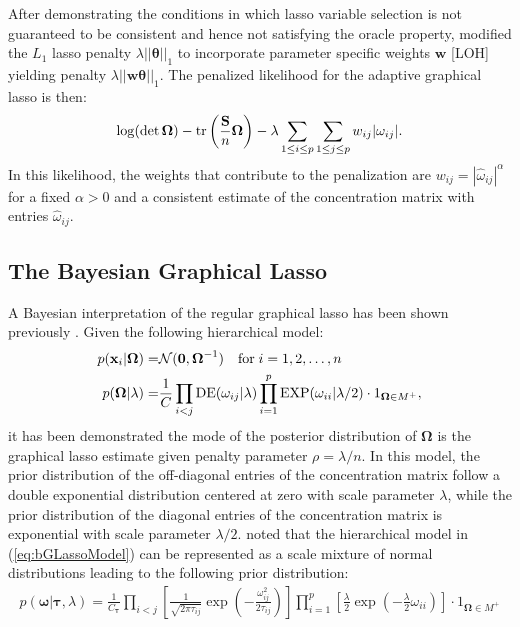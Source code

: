 After demonstrating the conditions in which lasso variable selection is not guaranteed to be consistent and hence not satisfying the oracle property, \cite{zou2006} modified the $L_1$ lasso penalty $\lambda ||\boldsymbol{\theta}||_1$ to incorporate parameter specific weights $\textbf{w}$ [LOH] yielding penalty $\lambda ||\textbf{w} \boldsymbol{\theta}||_1$. The penalized likelihood for the adaptive graphical lasso is then:
\begin{align}
\log(\det \boldsymbol{\Omega})-\operatorname{tr} \left(\frac{\mathbf{S}}{n} \boldsymbol{\Omega}\right) - \lambda \sum_{1\leq i \leq p} \sum_{1 \leq j \leq p} w_{ij} |\omega_{ij}|.
\end{align}
In this likelihood, the weights that contribute to the penalization are $w_{ij}=|\hat{\omega}_{ij}|^\alpha$ for a fixed $\alpha >0$ and a consistent estimate of the concentration matrix with entries $\hat{\omega}_{ij}$.

\subsection{The Bayesian Graphical Lasso}
A Bayesian interpretation of the regular graphical lasso \cite{friedman2007} has been shown previously \cite{wang2012}. Given the following hierarchical model:
\begin{align}
p(\textbf{x}_i|\boldsymbol{\Omega}) =& \mathcal{N}(\textbf{0},\boldsymbol{\Omega}^{-1}) \quad \text{for} \; i=1,2,\hdots,n\\
p(\boldsymbol{\Omega}|\lambda) =& \frac{1}{C} \prod_{i<j} \operatorname{DE}(\omega_{ij}|\lambda) \prod_{i=1}^{p} \operatorname{EXP} (\omega_{ii} | \lambda / 2) \cdot 1_{\boldsymbol{\Omega}\in M^+},
\label{eq:bGLassoModel}
\end{align}
it has been demonstrated the mode of the posterior distribution of $\boldsymbol{\Omega}$ is the graphical lasso estimate given penalty parameter $\rho=\lambda/n$. In this model, the prior distribution of the off-diagonal entries of the concentration matrix follow a double exponential distribution centered at zero with scale parameter $\lambda$, while the prior distribution of the diagonal entries of the concentration matrix is exponential with scale parameter $\lambda/2$. \cite{wang2012}  noted that the hierarchical model in (\ref{eq:bGLassoModel}) can be represented as a scale mixture of normal distributions \cite{andrews1974,west1987} leading to the following prior distribution:
\begin{align}
p(\boldsymbol{\omega}| \boldsymbol{\tau},\lambda)=\frac{1}{C_{\boldsymbol{\tau}}} \prod_{i<j} \left[ \frac{1}{\sqrt{2\pi \tau_{ij}}} \exp \left(- \frac{\omega_{ij}^2}{2\tau_{ij}}\right) \right] \prod_{i=1}^{p} \left[\frac{\lambda}{2} \exp \left(-\frac{\lambda}{2}\omega_{ii} \right)\right] \cdot 1_{\boldsymbol{\Omega}\in M^+}
\end{align}

